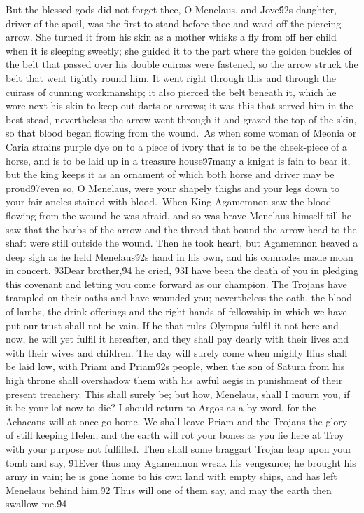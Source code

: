{But the blessed gods did not forget thee, O Menelaus, and Jove\'92s daughter, driver of the spoil, was the first to stand before thee and ward off the piercing arrow. She turned it from his skin as a mother whisks a fly from off her child when it is sleeping sweetly; she guided it to the part where the golden buckles of the belt that passed over his double cuirass were fastened, so the arrow struck the belt that went tightly round him. It went right through this and through the cuirass of cunning workmanship; it also pierced the belt beneath it, which he wore next his skin to keep out darts or arrows; it was this that served him in the best stead, nevertheless the arrow went through it and grazed the top of the skin, so that blood began flowing from the wound.\
As when some woman of Meonia or Caria strains purple dye on to a piece of ivory that is to be the cheek-piece of a horse, and is to be laid up in a treasure house\'97many a knight is fain to bear it, but the king keeps it as an ornament of which both horse and driver may be proud\'97even so, O Menelaus, were your shapely thighs and your legs down to your fair ancles stained with blood.\
When King Agamemnon saw the blood flowing from the wound he was afraid, and so was brave Menelaus himself till he saw that the barbs of the arrow and the thread that bound the arrow-head to the shaft were still outside the wound. Then he took heart, but Agamemnon heaved a deep sigh as he held Menelaus\'92s hand in his own, and his comrades made moan in concert. \'93Dear brother,\'94 he cried, \'93I have been the death of you in pledging this covenant and letting you come forward as our champion. The Trojans have trampled on their oaths and have wounded you; nevertheless the oath, the blood of lambs, the drink-offerings and the right hands of fellowship in which we have put our trust shall not be vain. If he that rules Olympus fulfil it not here and now, he will yet fulfil it hereafter, and they shall pay dearly with their lives and with their wives and children. The day will surely come when mighty Ilius shall be laid low, with Priam and Priam\'92s people, when the son of Saturn from his high throne shall overshadow them with his awful aegis in punishment of their present treachery. This shall surely be; but how, Menelaus, shall I mourn you, if it be your lot now to die? I should return to Argos as a by-word, for the Achaeans will at once go home. We shall leave Priam and the Trojans the glory of still keeping Helen, and the earth will rot your bones as you lie here at Troy with your purpose not fulfilled. Then shall some braggart Trojan leap upon your tomb and say, \'91Ever thus may Agamemnon wreak his vengeance; he brought his army in vain; he is gone home to his own land with empty ships, and has left Menelaus behind him.\'92 Thus will one of them say, and may the earth then swallow me.\'94\
}

